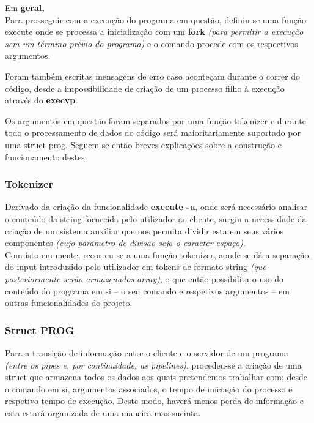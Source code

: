 \documentclass{report}
\begin{document}
Em \textbf{geral,}\\

Para prosseguir com a execução do programa em questão, definiu-se uma função execute onde se processa a inicialização com um \textbf{fork} \textit{(para permitir a execução sem um término prévio do programa)} e o comando procede com os respectivos argumentos.\par
Foram também escritas mensagens de erro caso aconteçam durante o correr do código, desde a impossibilidade de criação de um processo filho à execução através do \textbf{execvp}.\par
Os argumentos em questão foram separados por uma função tokenizer e durante todo o processamento de dados do código será maioritariamente suportado por uma struct prog. Seguem-se então breves explicações sobre a construção e funcionamento destes.

\subsubsection{\underline{Tokenizer}}

Derivado da criação da funcionalidade \textbf{execute -u}, onde será necessário analisar o conteúdo da string fornecida pelo utilizador ao cliente, surgiu a necessidade da criação de um sistema auxiliar que nos permita dividir esta em seus vários componentes \textit{(cujo parâmetro de divisão seja o caracter espaço)}.\\
Com isto em mente, recorreu-se a uma função tokenizer, aonde se dá a separação do input introduzido pelo utilizador em tokens de formato string \textit{(que posteriormente serão armazenados array)}, o que então possibilita o uso do conteúdo do programa em si – o seu comando e respetivos argumentos – em outras funcionalidades do projeto.

\subsubsection{\underline{Struct \textbf{PROG}}}

Para a transição de informação entre o cliente e o servidor de um programa \textit{(entre os pipes e, por continuidade, as pipelines)}, procedeu-se a criação de uma struct que armazena todos os dados aos quais pretendemos trabalhar com; desde o comando em si, argumentos associados, o tempo de iniciação do processo e respetivo tempo de execução. Deste modo, haverá menos perda de informação e esta estará organizada de uma maneira mas sucinta.
\end{document}
